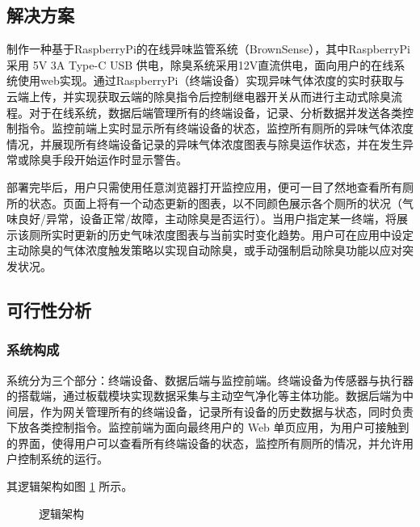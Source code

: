 \documentclass[UTF8]{ctexart}
\begin{document}
\subsection{解决方案}
制作一种基于RaspberryPi的在线异味监管系统（BrownSense），其中RaspberryPi采用 5V 3A Type-C USB 供电，除臭系统采用12V直流供电，面向用户的在线系统使用web实现。通过RaspberryPi（终端设备）实现异味气体浓度的实时获取与云端上传，并实现获取云端的除臭指令后控制继电器开关从而进行主动式除臭流程。对于在线系统，数据后端管理所有的终端设备，记录、分析数据并发送各类控制指令。监控前端上实时显示所有终端设备的状态，监控所有厕所的异味气体浓度情况，并展现所有终端设备记录的异味气体浓度图表与除臭运作状态，并在发生异常或除臭手段开始运作时显示警告。

部署完毕后，用户只需使用任意浏览器打开监控应用，便可一目了然地查看所有厕所的状态。页面上将有一个动态更新的图表，以不同颜色展示各个厕所的状况（气味良好/异常，设备正常/故障，主动除臭是否运行）。当用户指定某一终端，将展示该厕所实时更新的历史气味浓度图表与当前实时变化趋势。用户可在应用中设定主动除臭的气体浓度触发策略以实现自动除臭，或手动强制启动除臭功能以应对突发状况。
\subsection{可行性分析}
\subsubsection{系统构成}
系统分为三个部分：终端设备、数据后端与监控前端。终端设备为传感器与执行器的搭载端，通过板载模块实现数据采集与主动空气净化等主体功能。数据后端为中间层，作为网关管理所有的终端设备，记录所有设备的历史数据与状态，同时负责下放各类控制指令。监控前端为面向最终用户的 Web 单页应用，为用户可接触到的界面，使得用户可以查看所有终端设备的状态，监控所有厕所的情况，并允许用户控制系统的运行。

其逻辑架构如图 \ref{fig:diagram} 所示。
\begin{figure}[h]
    \noindent{}
    \caption{逻辑架构}\label{fig:diagram}
\end{figure}
\end{document}
